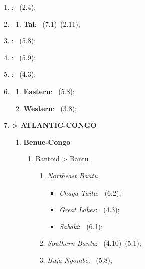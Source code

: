 \begin{enumerate}
\begin{enumerate}
    \end{enumerate}
    \item \MakeUppercase{\textbf{\langfamily{\famJaponic}}}: \langnameJapanese\ (2.4);
    \item \MakeUppercase{\textbf{\langfamily{\famKraDai}}}
    \begin{enumerate}
        \item \textbf{Tai}: \langnameNung\ (7.1)\EnumComma\langnameThai\ (2.11);
    \end{enumerate}
    \item \MakeUppercase{\textbf{\langfamily{\famMayan}}}: \langnameTzeltal\ (5.8);
    \item \MakeUppercase{\textbf{\langfamily{\famMisumalpan}}}: \langnameUlwa\ (5.9);
    \item \MakeUppercase{\textbf{\langfamily{\famMixeZoquean}}}: \langnameZoque\ (4.3);
    \item \MakeUppercase{\textbf{\langfamily{\famMuskogean}}}
    \begin{enumerate}
        \item \textbf{Eastern}: \langnameAlabama\ (5.8);
        \item \textbf{Western}: \langnameChickasaw\ (3.8);
    \end{enumerate}
    \item \MakeUppercase{\textbf{\langfamily{\famNigerCongo} > ATLANTIC-CONGO}}
    \begin{enumerate}
        \item \textbf{Benue-Congo}
        \begin{enumerate}
            \item \uline{Bantoid > Bantu}
            \begin{enumerate}
                \item \textit{Northeast Bantu}
                \begin{itemize}
                    \item \textit{Chaga-Taita}: \langnameDabida\ (6.2);
                    \item \textit{Great Lakes}: \langnameLunyole\ (4.3);
                    \item \textit{Sabaki}: \langnameSwahili\ (6.1);
                \end{itemize}
                \item \textit{Southern Bantu}: \langnameSesotho\ (4.10)\EnumComma\langnameZulu\ (5.1);
                \item \textit{Buja-Ngombe}: \langnameNgombe\ (5.8);

\end{enumerate}
\end{enumerate}
\end{enumerate}
\end{enumerate}
